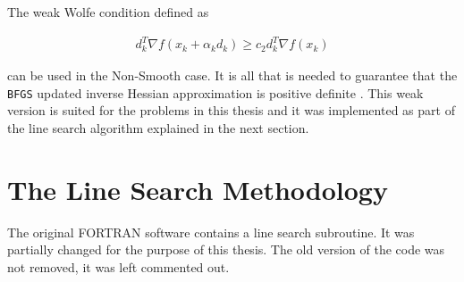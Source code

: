 The weak Wolfe condition defined as

\begin{equation}
  \begin{aligned}
    d_k^T \nabla f(x_k + \alpha _k d_k) \geq c_2 d_k^T \nabla f(x_k)
  \end{aligned}
\end{equation}

can be used in the Non-Smooth case. It is all that is needed to guarantee that the \texttt{BFGS} updated inverse Hessian approximation is positive definite \citep{overtonlewis}. This weak version is suited for the problems in this thesis and it was implemented as part of the line search algorithm explained in the next section.

\section{The Line Search Methodology}

The original \textsc{FORTRAN} software \citep{lbfgsbsoftware} contains a line search subroutine. It was partially changed for the purpose of this thesis. The old version of the code was not removed, it was left commented out. 





